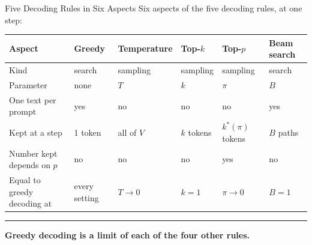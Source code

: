 \documentclass[8pt,aspectratio=169]{beamer}
\newcommand{\bottomnote}[1]{%
\vfill\vspace{-2mm}
\textcolor{mllavender2}{\rule{\textwidth}{0.4pt}}
\vspace{1mm}\footnotesize\textbf{#1}}
\begin{document}
\begin{frame}[t]{Five Decoding Rules in Six Aspects}
Six aspects of the five decoding rules, at one step:

\vspace{2mm}
\begin{center}
\begin{tabular}{llllll}
\toprule
Aspect & Greedy & Temperature & Top-$k$ & Top-$p$ & Beam search \\
\midrule
Kind & search & sampling & sampling & sampling & search \\
Parameter & none & $T$ & $k$ & $\pi$ & $B$ \\
One text per prompt & yes & no & no & no & yes \\
Kept at a step & 1 token & all of $V$ & $k$ tokens & $k^*(\pi)$ tokens & $B$ paths \\
Number kept depends on $p$ & no & no & no & yes & no \\
Equal to greedy decoding at & every setting & $T \to 0$ & $k = 1$ & $\pi \to 0$ & $B = 1$ \\
\bottomrule
\end{tabular}
\end{center}

\bottomnote{Greedy decoding is a limit of each of the four other rules.}
\end{frame}
\end{document}
